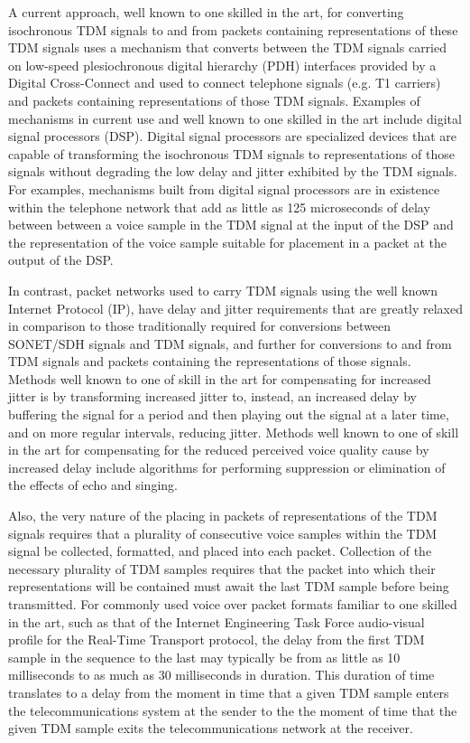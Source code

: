 \documentclass[letterpaper,final,notitlepage,twocolumn,10pt,twoside]{article}
\begin{document}
A current approach, well known to one skilled in the art, for converting
isochronous TDM signals to and from packets containing representations of
these TDM signals uses a mechanism that converts between the TDM signals
carried on low-speed plesiochronous digital hierarchy (PDH) interfaces
provided by a Digital Cross-Connect and used to connect telephone signals
(e.g. T1 carriers) and packets containing representations of those TDM
signals.  Examples of mechanisms in current use and well known to one skilled
in the art include digital signal processors (DSP).  Digital signal processors
are specialized devices that are capable of transforming the isochronous TDM
signals to representations of those signals without degrading the low delay
and jitter exhibited by the TDM signals.  For examples, mechanisms built from
digital signal processors are in existence within the telephone network that
add as little as 125 microseconds of delay between between a voice sample in
the TDM signal at the input of the DSP and the representation of the voice
sample suitable for placement in a packet at the output of the DSP.

In contrast, packet networks used to carry TDM signals using the well known
Internet Protocol (IP), have delay and jitter requirements that are greatly
relaxed in comparison to those traditionally required for conversions between
SONET/SDH signals and TDM signals, and further for conversions to and from TDM
signals and packets containing the representations of those signals.  Methods
well known to one of skill in the art for compensating for increased jitter is
by transforming increased jitter to, instead, an increased delay by buffering
the signal for a period and then playing out the signal at a later time, and
on more regular intervals, reducing jitter.  Methods well known to one of
skill in the art for compensating for the reduced perceived voice quality
cause by increased delay include algorithms for performing suppression or
elimination of the effects of echo and singing.

Also, the very nature of the placing in packets of representations of the TDM
signals requires that a plurality of consecutive voice samples within the TDM
signal be collected, formatted, and placed into each packet.  Collection of
the necessary plurality of TDM samples requires that the packet into which
their representations will be contained must await the last TDM sample before
being transmitted.  For commonly used voice over packet formats familiar to
one skilled in the art, such as that of the Internet Engineering Task Force
audio-visual profile for the Real-Time Transport protocol, the delay from the
first TDM sample in the sequence to the last may typically be from as little
as 10 milliseconds to as much as 30 milliseconds in duration.  This duration
of time translates to a delay from the moment in time that a given TDM sample
enters the telecommunications system at the sender to the the moment of time
that the given TDM sample exits the telecommunications network at the
receiver.
\end{document}
